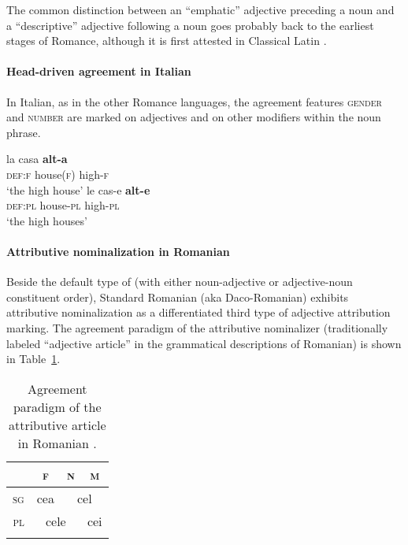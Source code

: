 The common distinction between an “emphatic” adjective preceding a noun and a “descriptive” adjective following a noun goes probably back to the earliest stages of Romance, although it is first attested in Classical Latin \citep[146]{posner1996}.

\paragraph*{Head\hyp{}driven agreement in Italian} 
In Italian, as in the other Romance languages, the agreement features \textsc{gender} and \textsc{number} are marked on adjectives and on other modifiers within the noun phrase.
\begin{exe}
\begin{xlist}
\ex
\gll	la casa \textbf{alt-a}\\
	\textsc{def:f} house(\textsc{f}) high-\textsc{f}\\
\glt	‘the high house’
\ex
\gll	le cas-e \textbf{alt-e}\\
	\textsc{def:pl} house-\textsc{pl} high-\textsc{pl}\\
\glt	‘the high houses’
\end{xlist}
\end{exe}


\paragraph*{Attributive nominalization in Romanian}
\label{romanian synchr}
Beside the default type of  (with either noun-adjective or adjective-noun constituent order), Standard Romanian (aka Daco-Romanian) exhibits attributive nominalization as a differentiated third type of adjective attribution marking. The agreement paradigm of the attributive nominalizer (traditionally labeled “adjective article” in the grammatical descriptions of Romanian) is shown in Table~\ref{romanian art}.

\begin{table}[b]
\begin{tabular}{r c c c}
\lsptoprule		
			&\textsc{f}				&\textsc{n}		&\textsc{m}\\
\midrule
\textsc{sg}		&cea					&\multicolumn{2}{|c}{cel}\\
\midrule
\textsc{pl}		&\multicolumn{2}{c|}{cele}					&cei\\
\lspbottomrule
\end{tabular}
\caption[Article paradigm for Romanian]{Agreement paradigm of the attributive article in Romanian \citep[94]{beyer-etal1987}.
}
\label{romanian art}
\end{table}

